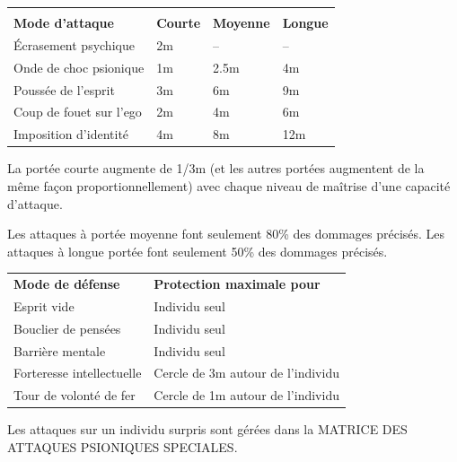 {\begin{tabular}{p{5cm} >{\centering\arraybackslash}p{2.5cm}>{\centering\arraybackslash}p{2.5cm}>{\centering\arraybackslash}p{2.5cm}}
&\multicolumn{3}{c}{\textbf{Portée}} \\
\textbf{Mode d'attaque} & \textbf{Courte} & \textbf{Moyenne} & \textbf{Longue} \\
Écrasement psychique    & 2m & --   & -- \\
Onde de choc psionique  & 1m & 2.5m & 4m \\
Poussée de l'esprit     & 3m & 6m   & 9m \\
Coup de fouet sur l'ego & 2m & 4m   & 6m \\
Imposition d'identité   & 4m & 8m   & 12m \\
\end{tabular}

\medskip

La portée courte augmente de 1/3m (et les autres portées augmentent de la même façon proportionnellement) avec chaque niveau de maîtrise d'une capacité d'attaque.

\medskip

Les attaques à portée moyenne font seulement 80\% des dommages précisés. Les attaques à longue portée font seulement 50\% des dommages précisés.

\bigskip

\begin{tabular}{p{7.5cm}p{6cm}}
\textbf{Mode de défense}    & \textbf{Protection maximale pour} \\
Esprit vide                 & Individu seul \\
Bouclier de pensées         & Individu seul \\
Barrière mentale            & Individu seul \\
Forteresse intellectuelle   & Cercle de 3m autour de l'individu \\
Tour de volonté de fer      & Cercle de 1m autour de l'individu \\
\end{tabular}

\bigskip

Les attaques sur un individu surpris sont gérées dans la MATRICE DES ATTAQUES PSIONIQUES SPECIALES.

\medskip

}
